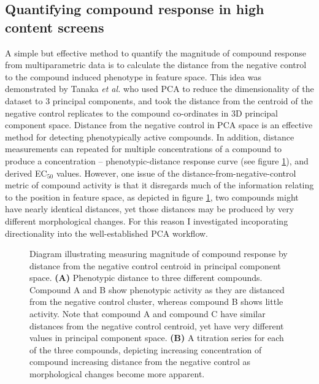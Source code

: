 \documentclass[a4paper,11pt,twoside,openright]{scrbook}
\begin{document}
\subsection{Quantifying compound response in high content screens}
A simple but effective method to quantify the magnitude of compound response from multiparametric data is to calculate the distance from the negative control to the compound induced phenotype in feature space.
This idea was demonstrated by Tanaka \textit{et al.} who used PCA to reduce the dimensionality of the dataset to 3 principal components, and took the distance from the centroid of the negative control replicates to the compound co-ordinates in 3D principal component space. \cite{Tanaka2005}
Distance from the negative control in PCA space is an effective method for detecting phenotypically active compounds.
In addition, distance measurements can repeated for multiple concentrations of a compound to produce a concentration -- phenotypic-distance response curve (see figure \ref{figure:pca_dist}), and derived EC$_{50}$ values.
However, one issue of the distance-from-negative-control metric of compound activity is that it disregards much of the information relating to the position in feature space, as depicted in figure \ref{figure:pca_dist}, two compounds might have nearly identical distances, yet those distances may be produced by very different morphological changes.
For this reason I investigated incoporating directionality into the well-established PCA workflow.

\begin{figure}
    \captionsetup{width=0.8\textwidth}
    \caption[Compound distance in principal component space]{
    Diagram illustrating measuring magnitude of compound response by distance from the negative control centroid in principal component space.
    \textbf{(A)} Phenotypic distance to three different compounds.
    Compound A and B show phenotypic activity as they are distanced from the negative control cluster, whereas compound B shows little activity.
    Note that compound A and compound C have similar distances from the negative control centroid, yet have very different values in principal component space.
    \textbf{(B)} A titration series for each of the three compounds, depicting increasing concentration of compound increasing distance from the negative control as morphological changes become more apparent.
}
    
    \label{figure:pca_dist}
\end{figure}

\end{document}
